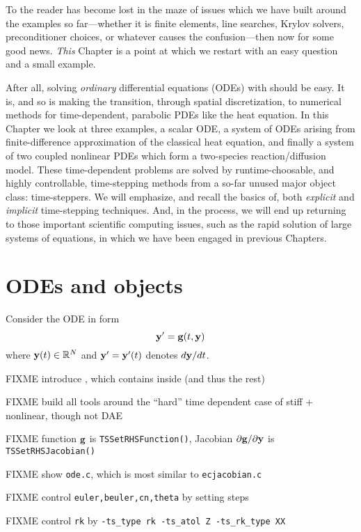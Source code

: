 
To the reader has become lost in the maze of issues which we have built around the examples so far---whether it is finite elements, line searches, Krylov solvers, preconditioner choices, or whatever causes the confusion---then now for some good news.  \emph{This} Chapter is a point at which we restart with an easy question and a small example.

After all, solving \emph{ordinary} differential equations (ODEs) with \PETSc should be easy.  It is, and so is making the transition, through spatial discretization, to numerical methods for time-dependent, parabolic PDEs like the heat equation.  In this Chapter we look at three examples, a scalar ODE, a system of ODEs arising from finite-difference approximation of the classical heat equation, and finally a system of two coupled nonlinear PDEs which form a two-species reaction/diffusion model.  These time-dependent problems are solved by runtime-choosable, and highly controllable, time-stepping methods from a so-far unused major \PETSc object class: \pTS time-steppers.  We will emphasize, and recall the basics of, both \emph{explicit} and \emph{implicit} time-stepping techniques.  And, in the process, we will end up returning to those important scientific computing issues, such as the rapid solution of large systems of equations, in which we have been engaged in previous Chapters.


\section{ODEs and \PETSc \pTS objects}

Consider the ODE in form
\begin{equation}
\mathbf{y}' = \mathbf{g}(t,\mathbf{y}) \label{eq:ts:ode}
\end{equation}
where $\mathbf{y}(t) \in \mathbb{R}^N$ and $\mathbf{y}'=\mathbf{y}'(t)$ denotes $d\mathbf{y}/dt$.

FIXME introduce \pTS, which contains \pSNES inside (and thus the rest)

FIXME build all tools around the ``hard'' time dependent case of stiff + nonlinear, though not DAE

FIXME function $\mathbf{g}$ is \texttt{TSSetRHSFunction()}, Jacobian $\partial \mathbf{g}/\partial \mathbf{y}$ is \texttt{TSSetRHSJacobian()}

FIXME show \texttt{ode.c}, which is most similar to \texttt{ecjacobian.c}

FIXME control \texttt{euler,beuler,cn,theta} by setting steps

FIXME control \texttt{rk} by \texttt{-ts\_type rk -ts\_atol Z -ts\_rk\_type XX}


